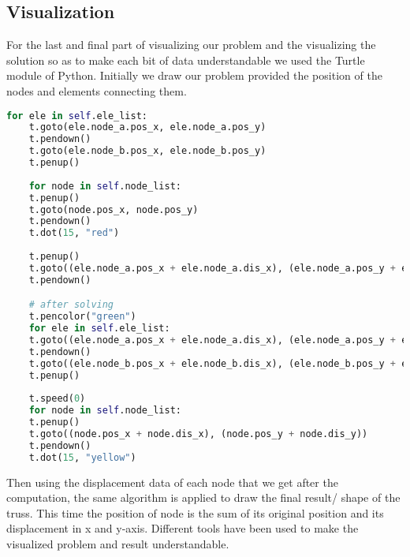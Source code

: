 \subsection{Visualization}
For the last and final part of visualizing our problem and the visualizing the solution so as to make each bit of data understandable we used the Turtle module of Python. Initially we draw our problem provided the position of the nodes and elements connecting them.

\begin{lstlisting}[language=Python , basicstyle=\linespread{0.75}\listingsfont]
	for ele in self.ele_list:
	t.goto(ele.node_a.pos_x, ele.node_a.pos_y)
	t.pendown()
	t.goto(ele.node_b.pos_x, ele.node_b.pos_y)
	t.penup()
	
	for node in self.node_list:
	t.penup()
	t.goto(node.pos_x, node.pos_y)
	t.pendown()
	t.dot(15, "red")
	
	t.penup()
	t.goto((ele.node_a.pos_x + ele.node_a.dis_x), (ele.node_a.pos_y + ele.node_a.dis_y))
	t.pendown()

	# after solving
	t.pencolor("green")
	for ele in self.ele_list:
	t.goto((ele.node_a.pos_x + ele.node_a.dis_x), (ele.node_a.pos_y + ele.node_a.dis_y))
	t.pendown()
	t.goto((ele.node_b.pos_x + ele.node_b.dis_x), (ele.node_b.pos_y + ele.node_b.dis_y))
	t.penup()
	
	t.speed(0)
	for node in self.node_list:
	t.penup()
	t.goto((node.pos_x + node.dis_x), (node.pos_y + node.dis_y))
	t.pendown()
	t.dot(15, "yellow")

\end{lstlisting}

 Then using the displacement data of each node that we get after the computation, the same algorithm is applied to draw the final result/ shape of the truss. This time the position of node is the sum of its original position and its displacement in x and y-axis. Different tools have been used to make the visualized problem and result understandable.

